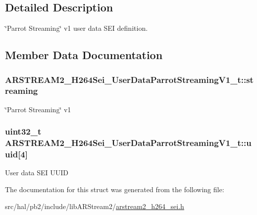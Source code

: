 \subsection{Detailed Description}
\char`\"{}\+Parrot Streaming\char`\"{} v1 user data S\+EI definition. 

\subsection{Member Data Documentation}
\subsubsection[{\texorpdfstring{streaming}{streaming}}]{ A\+R\+S\+T\+R\+E\+A\+M2\+\_\+\+H264\+Sei\+\_\+\+User\+Data\+Parrot\+Streaming\+V1\+\_\+t\+::streaming}\hypertarget{struct_a_r_s_t_r_e_a_m2___h264_sei___user_data_parrot_streaming_v1__t_a5d36a1632f79e1f34c5bbdccb036bbe7}{}\label{struct_a_r_s_t_r_e_a_m2___h264_sei___user_data_parrot_streaming_v1__t_a5d36a1632f79e1f34c5bbdccb036bbe7}
\char`\"{}\+Parrot Streaming\char`\"{} v1 
\subsubsection[{\texorpdfstring{uuid}{uuid}}]{\setlength{\rightskip}{0pt plus 5cm}uint32\+\_\+t A\+R\+S\+T\+R\+E\+A\+M2\+\_\+\+H264\+Sei\+\_\+\+User\+Data\+Parrot\+Streaming\+V1\+\_\+t\+::uuid\mbox{[}4\mbox{]}}\hypertarget{struct_a_r_s_t_r_e_a_m2___h264_sei___user_data_parrot_streaming_v1__t_a107c8923411c528a6434cd4253a34a0d}{}\label{struct_a_r_s_t_r_e_a_m2___h264_sei___user_data_parrot_streaming_v1__t_a107c8923411c528a6434cd4253a34a0d}
User data S\+EI U\+U\+ID 

The documentation for this struct was generated from the following file\+:\begin{DoxyCompactItemize}
\item 
src/hal/pb2/include/lib\+A\+R\+Stream2/\hyperlink{arstream2__h264__sei_8h}{arstream2\+\_\+h264\+\_\+sei.\+h}\end{DoxyCompactItemize}
